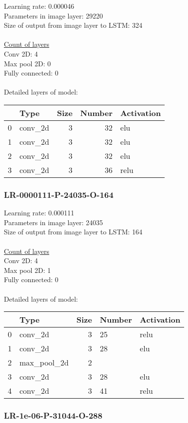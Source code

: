 Learning rate: 0.000046
\\Parameters in image layer: 29220
\\Size of output from image layer to LSTM: 324
\\\\\underline{Count of layers} 
\\Conv 2D:           4\\Max pool 2D:      0\\Fully connected:  0
\\\\Detailed layers of model: \\\begin{tabular}{rlrrl}
\hline
    & Type    &   Size &   Number & Activation   \\
\hline
  0 & conv\_2d &      3 &       32 & elu          \\
  1 & conv\_2d &      3 &       32 & elu          \\
  2 & conv\_2d &      3 &       32 & elu          \\
  3 & conv\_2d &      3 &       36 & relu         \\
\hline
\end{tabular}\subsubsection*{LR-0000111-P-24035-O-164}
Learning rate: 0.000111
\\Parameters in image layer: 24035
\\Size of output from image layer to LSTM: 164
\\\\\underline{Count of layers} 
\\Conv 2D:           4\\Max pool 2D:      1\\Fully connected:  0
\\\\Detailed layers of model: \\\begin{tabular}{rlrll}
\hline
    & Type        &   Size & Number   & Activation   \\
\hline
  0 & conv\_2d     &      3 & 25       & relu         \\
  1 & conv\_2d     &      3 & 28       & elu          \\
  2 & max\_pool\_2d &      2 &          &              \\
  3 & conv\_2d     &      3 & 28       & elu          \\
  4 & conv\_2d     &      3 & 41       & relu         \\
\hline
\end{tabular}\subsubsection*{LR-1e-06-P-31044-O-288}
